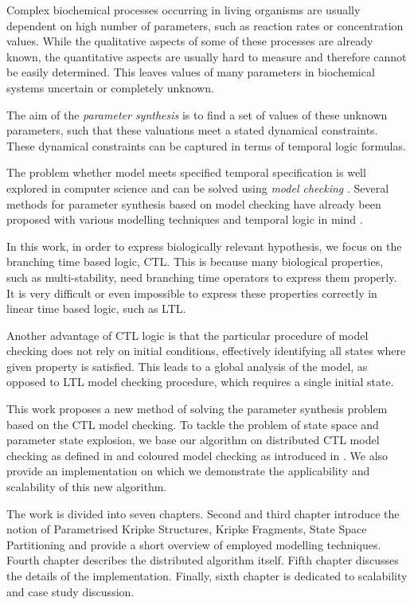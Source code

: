 \documentclass[12pt,oneside]{fithesis2}
\begin{document}
		Complex biochemical processes occurring in living organisms are usually dependent on high number of parameters, such as reaction rates or concentration values. While the qualitative aspects of some of these processes are already known, the quantitative aspects are usually hard to measure and therefore cannot be easily determined. This leaves values of many parameters in biochemical systems uncertain or completely unknown.
		
		The aim of the \emph{parameter synthesis} is to find a set of values of these unknown parameters, such that these valuations meet a stated dynamical constraints. These dynamical constraints can be captured in terms of temporal logic formulas. 
				
		The problem whether model meets specified temporal specification is well explored in computer science and can be solved using \emph{model checking} \cite{clarke}. Several methods for parameter synthesis based on model checking have already been proposed with various modelling techniques and temporal logic in mind \cite{ieee,batt,gilbert,donze,jha}.
		
		In this work, in order to express biologically relevant hypothesis, we focus on the branching time based logic, CTL. This is because many biological properties, such as multi-stability, need branching time operators to express them properly. It is very difficult or even impossible to express these properties correctly in linear time based logic, such as LTL. 
		
		Another advantage of CTL logic is that the particular procedure of model checking does not rely on initial conditions, effectively identifying all states where given property is satisfied. This leads to a global analysis of the model, as opposed to LTL model checking procedure, which requires a single initial state.
				
		This work proposes a new method of solving the parameter synthesis problem based on the CTL model checking. To tackle the problem of state space and parameter state explosion, we base our algorithm on distributed CTL model checking as defined in \cite{assumptions} and coloured model checking as introduced in \cite{ieee}. We also provide an implementation on which we demonstrate the applicability and scalability of this new algorithm. 		
		
		The work is divided into seven chapters. Second and third chapter introduce the notion of Parametrised Kripke Structures, Kripke Fragments, State Space Partitioning and provide a short overview of employed modelling techniques. Fourth chapter describes the distributed algorithm itself. Fifth chapter discusses the details of the implementation. Finally, sixth chapter is dedicated to scalability and case study discussion.
				
\end{document}
